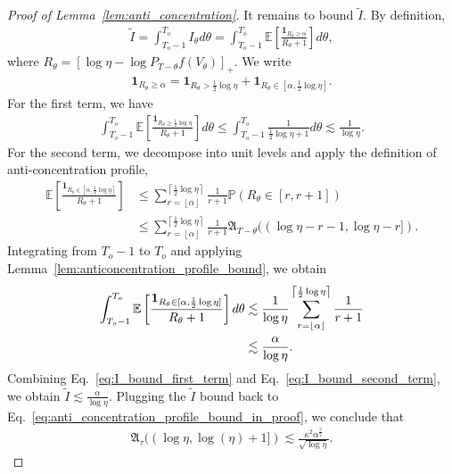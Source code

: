 \documentclass[11pt]{article}
\newcommand{\excess}{\alpha}
\newcommand{\fA}{\mathfrak{A}}
\newcommand{\btau}{\kappa}
\newcommand{\uV}{V}
\newcommand{\To}{{T_o}}
\theoremstyle{named}
\theoremstyle{plain}
\newcommand{\Exs}{\ensuremath{{\mathbb{E}}}}
\newcommand{\Prob}{\ensuremath{{\mathbb{P}}}}
\newcommand{\brackets}[1]{\left[ #1 \right]}
\newcommand{\ceils}[1]{\left\lceil #1 \right \rceil}
\newcommand{\floors}[1]{\left\lfloor #1 \right \rfloor}
\begin{document}
\begin{proof}[Proof of Lemma~\ref{lem:anti_concentration}]
  It remains to bound $\tilde{I}$. By definition, 
  \begin{align*}
    \tilde{I} = \int_{\To - 1}^{\To} I_\theta d\theta = \int_{\To - 1}^{\To} \Exs\brackets{\frac{\mathbf{1}_{R_\theta \geq \excess}}{R_\theta + 1}} d\theta,
  \end{align*}
  where $R_\theta = [\log \eta - \log P_{T-\theta} f(\uV_\theta)]_+$. We write 
  \begin{align*}
    \mathbf{1}_{R_\theta \geq \excess} = \mathbf{1}_{R_\theta > \frac12 \log \eta} + \mathbf{1}_{R_\theta \in [\excess, \frac12 \log \eta]}.
  \end{align*}
  For the first term, we have
  \begin{align}
    \label{eq:I_bound_first_term}
    \int_{\To - 1}^{\To} \Exs\brackets{\frac{\mathbf{1}_{R_\theta \geq \frac12 \log \eta}}{R_\theta + 1}} d\theta \leq \int_{\To - 1}^{\To} \frac{1}{\frac12 \log \eta + 1} d\theta \lesssim \frac{1}{\log \eta}.
  \end{align}
  For the second term, we decompose into unit levels and apply the definition of anti-concentration profile,
  \begin{align*}
    \Exs\brackets{\frac{\mathbf{1}_{R_\theta \in [\excess, \frac12 \log \eta]}}{R_\theta + 1}} &\leq \sum_{r = \floors{\excess}}^{\ceils{\frac12 \log \eta}} \frac{1}{r+1} \Prob(R_\theta \in [r, r + 1]) \\
    &\leq \sum_{r = \floors{\excess}}^{\ceils{\frac12 \log \eta}} \frac{1}{r+1} \fA_{T-\theta}((\log \eta - r - 1, \log \eta - r]).
  \end{align*}
  Integrating from $\To - 1$ to $\To$ and applying Lemma~\ref{lem:anticoncentration_profile_bound}, we obtain
  \begin{align}
    \label{eq:I_bound_second_term}
    \int_{\To - 1}^{\To} \Exs\brackets{\frac{\mathbf{1}_{R_\theta \in [\excess, \frac12 \log \eta]}}{R_\theta + 1}} d\theta &\lesssim \frac{1}{\log \eta} \sum_{r = \floors{\excess}}^{\ceils{\frac12 \log \eta}} \frac{1}{r+1}  \notag \\
    &\lesssim \frac{\excess}{\log \eta}.
  \end{align}
  Combining Eq.~\eqref{eq:I_bound_first_term} and Eq.~\eqref{eq:I_bound_second_term}, we obtain $\tilde{I} \lesssim \frac{\excess}{\log \eta}$. Plugging the $\tilde{I}$ bound back to Eq.~\eqref{eq:anti_concentration_profile_bound_in_proof}, we conclude that
  \begin{align*}
    \fA_\tau((\log \eta, \log(\eta) + 1]) \lesssim \frac{\btau^2 \excess^{\frac32}}{\sqrt{\log \eta}}.
  \end{align*}

\end{proof}
\end{document}
